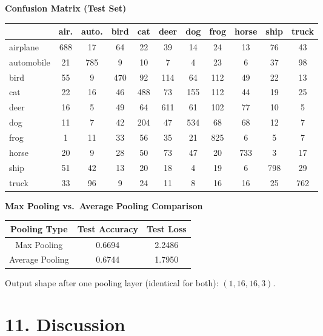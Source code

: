 \documentclass[11pt]{article}
\begin{document}
\vspace{3mm}

\textbf{Confusion Matrix (Test Set)}

\begin{center}
\begin{tabular}{|l|c|c|c|c|c|c|c|c|c|c|}
\hline
 & air. & auto. & bird & cat & deer & dog & frog & horse & ship & truck \\ \hline
airplane   & 688 & 17  & 64  & 22  & 39  & 14  & 24  & 13  & 76  & 43 \\ \hline
automobile & 21  & 785 & 9   & 10  & 7   & 4   & 23  & 6   & 37  & 98 \\ \hline
bird       & 55  & 9   & 470 & 92  & 114 & 64  & 112 & 49  & 22  & 13 \\ \hline
cat        & 22  & 16  & 46  & 488 & 73  & 155 & 112 & 44  & 19  & 25 \\ \hline
deer       & 16  & 5   & 49  & 64  & 611 & 61  & 102 & 77  & 10  & 5  \\ \hline
dog        & 11  & 7   & 42  & 204 & 47  & 534 & 68  & 68  & 12  & 7  \\ \hline
frog       & 1   & 11  & 33  & 56  & 35  & 21  & 825 & 6   & 5   & 7  \\ \hline
horse      & 20  & 9   & 28  & 50  & 73  & 47  & 20  & 733 & 3   & 17 \\ \hline
ship       & 51  & 42  & 13  & 20  & 18  & 4   & 19  & 6   & 798 & 29 \\ \hline
truck      & 33  & 96  & 9   & 24  & 11  & 8   & 16  & 16  & 25  & 762 \\ \hline
\end{tabular}
\end{center}

\vspace{3mm}

\textbf{Max Pooling vs.\ Average Pooling Comparison}

\begin{tabular}{|c|c|c|}
\hline
Pooling Type & Test Accuracy & Test Loss \\ \hline
Max Pooling     & 0.6694 & 2.2486 \\ \hline
Average Pooling & 0.6744 & 1.7950 \\ \hline
\end{tabular}

Output shape after one pooling layer (identical for both): $(1, 16, 16, 3)$.

\section*{11. Discussion}
\end{document}
